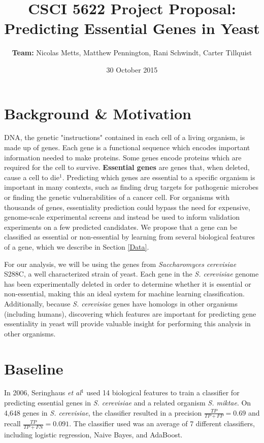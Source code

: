 \documentclass{article}
\title{CSCI 5622 Project Proposal: Predicting Essential Genes in Yeast}
\author{\textbf{Team:} Nicolas Metts, Matthew Pennington, Rani Schwindt, Carter Tillquist}
\date{30 October 2015}
\begin{document}
\maketitle

\section{Background \& Motivation}
DNA, the genetic "instructions" contained in each cell of a living organism, is made up of genes. Each gene is a functional sequence which encodes important information needed to make proteins. Some genes encode proteins which are required for the cell to survive. \textbf{Essential genes} are genes that, when deleted, cause a cell to die$^1$. Predicting which genes are essential to a specific organism is important in many contexts, such as finding drug targets for pathogenic microbes or finding the genetic vulnerabilities of a cancer cell. For organisms with thousands of genes, essentiality prediction could bypass the need for expensive, genome-scale experimental screens and instead be used to inform validation experiments on a few predicted candidates. We propose that a gene can be classified as essential or non-essential by learning from several biological features of a gene, which we describe in Section \ref{Data}. 

\vspace{3mm}

\noindent
For our analysis, we will be using the genes from \textit{Saccharomyces cerevisiae} S288C, a well characterized strain of yeast. Each gene in the \textit{S. cerevisiae} genome has been experimentally deleted in order to determine whether it is essential or non-essential, making this an ideal system for machine learning classification. Additionally, because \textit{S. cerevisiae} genes have homologs in other organisms (including humans), discovering which features are important for predicting gene essentiality in yeast will provide valuable insight for performing this analysis in other organisms.

\section{Baseline}

In 2006, Seringhaus \textit{et al}$^1$ used 14 biological features to train a classifier for predicting essential genes in \textit{S. cerevisiae} and a related organism \textit{S. miktae}. On 4,648 genes in \textit{S. cerevisiae}, the classifier resulted in a precision $\frac{TP}{TP+FP} = 0.69$ and recall $\frac{TP}{TP+FN} = 0.091$. The classifier used was an average of 7 different classifiers, including logistic regression, Naive Bayes, and AdaBoost.
\end{document}
